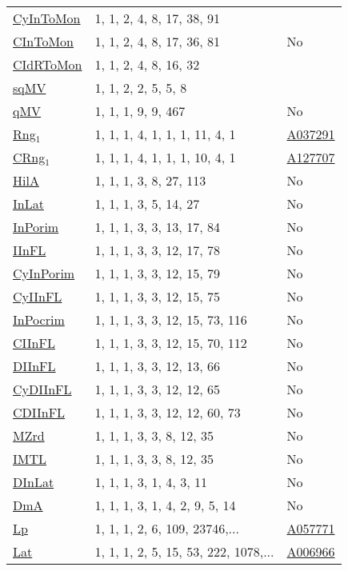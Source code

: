 {\begin{tabular}{|l|l|l|}
\hyperlink{CyInToMon}{CyInToMon}& 1, 1, 2, 4, 8, 17, 38, 91 &\\
\hyperlink{CInToMon}{CInToMon}& 1, 1, 2, 4, 8, 17, 36, 81 &No\\
\hyperlink{CIdRToMon}{CIdRToMon}& 1, 1, 2, 4, 8, 16, 32 &\\
\hyperlink{sqMV}{sqMV}& 1, 1, 2, 2, 5, 5, 8 &\\
\hyperlink{qMV}{qMV}& 1, 1, 1, 9, 9, 467 &No\\
\hyperlink{Rng$_1$}{Rng$_1$}& 1, 1, 1, 4, 1, 1, 1, 11, 4, 1 &\href{http://oeis.org/A037291}{A037291}\\
\hyperlink{CRng$_1$}{CRng$_1$}& 1, 1, 1, 4, 1, 1, 1, 10, 4, 1 &\href{http://oeis.org/A127707}{A127707}\\
\hyperlink{HilA}{HilA}& 1, 1, 1, 3, 8, 27, 113 &No\\
\hyperlink{InLat}{InLat}& 1, 1, 1, 3, 5, 14, 27 &No\\
\hyperlink{InPorim}{InPorim}& 1, 1, 1, 3, 3, 13, 17, 84 &No\\
\hyperlink{IInFL}{IInFL}& 1, 1, 1, 3, 3, 12, 17, 78 &No\\
\hyperlink{CyInPorim}{CyInPorim}& 1, 1, 1, 3, 3, 12, 15, 79 &No\\
\hyperlink{CyIInFL}{CyIInFL}& 1, 1, 1, 3, 3, 12, 15, 75 &No\\
\hyperlink{InPocrim}{InPocrim}& 1, 1, 1, 3, 3, 12, 15, 73, 116 &No\\
\hyperlink{CIInFL}{CIInFL}& 1, 1, 1, 3, 3, 12, 15, 70, 112 &No\\
\hyperlink{DIInFL}{DIInFL}& 1, 1, 1, 3, 3, 12, 13, 66 &No\\
\hyperlink{CyDIInFL}{CyDIInFL}& 1, 1, 1, 3, 3, 12, 12, 65 &No\\
\hyperlink{CDIInFL}{CDIInFL}& 1, 1, 1, 3, 3, 12, 12, 60, 73 &No\\
\hyperlink{MZrd}{MZrd}& 1, 1, 1, 3, 3, 8, 12, 35 &No\\
\hyperlink{IMTL}{IMTL}& 1, 1, 1, 3, 3, 8, 12, 35 &No\\
\hyperlink{DInLat}{DInLat}& 1, 1, 1, 3, 1, 4, 3, 11 &No\\
\hyperlink{DmA}{DmA}& 1, 1, 1, 3, 1, 4, 2, 9, 5, 14 &No\\
\hyperlink{Lp}{Lp}& 1, 1, 1, 2, 6, 109, 23746,... &\href{http://oeis.org/A057771}{A057771}\\
\hyperlink{Lat}{Lat}& 1, 1, 1, 2, 5, 15, 53, 222, 1078,... &\href{http://oeis.org/A006966}{A006966}\\

\end{tabular}}
